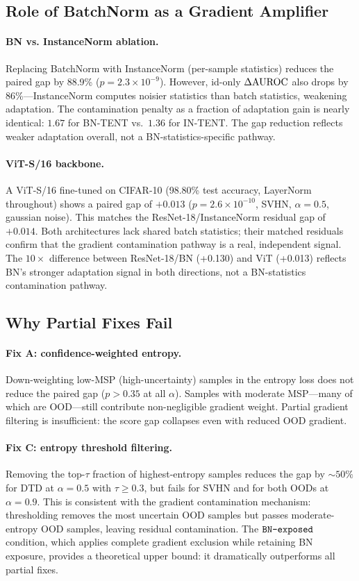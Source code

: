 \subsection{Role of BatchNorm as a Gradient Amplifier}

\paragraph{BN vs. InstanceNorm ablation.}
Replacing BatchNorm with InstanceNorm (per-sample statistics) reduces the paired gap by 88.9\% ($p = 2.3 \times 10^{-9}$).
However, id-only $\Delta\text{AUROC}$ also drops by 86\%---InstanceNorm computes noisier statistics than batch statistics, weakening adaptation.
The contamination penalty as a fraction of adaptation gain is nearly identical: $1.67$ for BN-TENT vs.\ $1.36$ for IN-TENT.
The gap reduction reflects weaker adaptation overall, not a BN-statistics-specific pathway.

\paragraph{ViT-S/16 backbone.}
A ViT-S/16 \citep{vit} fine-tuned on CIFAR-10 (98.80\% test accuracy, LayerNorm throughout) shows a paired gap of $+0.013$ ($p = 2.6 \times 10^{-10}$, SVHN, $\alpha=0.5$, gaussian noise).
This matches the ResNet-18/InstanceNorm residual gap of $+0.014$.
Both architectures lack shared batch statistics; their matched residuals confirm that the gradient contamination pathway is a real, independent signal.
The $10\times$ difference between ResNet-18/BN (+0.130) and ViT (+0.013) reflects BN's stronger adaptation signal in both directions, not a BN-statistics contamination pathway.

\subsection{Why Partial Fixes Fail}

\paragraph{Fix A: confidence-weighted entropy.}
Down-weighting low-MSP (high-uncertainty) samples in the entropy loss does not reduce the paired gap ($p > 0.35$ at all $\alpha$).
Samples with moderate MSP---many of which are OOD---still contribute non-negligible gradient weight.
Partial gradient filtering is insufficient: the score gap collapses even with reduced OOD gradient.

\paragraph{Fix C: entropy threshold filtering.}
Removing the top-$\tau$ fraction of highest-entropy samples reduces the gap by $\sim 50\%$ for DTD at $\alpha = 0.5$ with $\tau \ge 0.3$, but fails for SVHN and for both OODs at $\alpha = 0.9$.
This is consistent with the gradient contamination mechanism: thresholding removes the most uncertain OOD samples but passes moderate-entropy OOD samples, leaving residual contamination.
The $\texttt{BN-exposed}$ condition, which applies complete gradient exclusion while retaining BN exposure, provides a theoretical upper bound: it dramatically outperforms all partial fixes.
